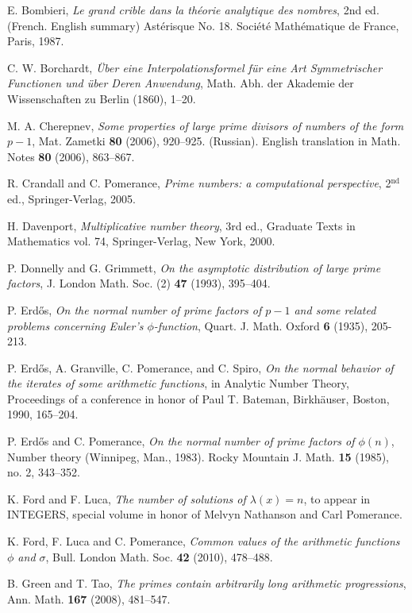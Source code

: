 \documentclass[12pt]{amsart}
\theoremstyle{remark}
\theoremstyle{plain}
\numberwithin{equation}{section}
\renewcommand{\(}{\left(}
\renewcommand{\)}{\right)}
\begin{document}
\begin{thebibliography}{BFLSP}
 E. Bombieri, {\it Le grand crible dans la th\'eorie
    analytique des nombres}, 2nd ed. (French.  English summary)
Ast\'erisque No. 18. Soci\'et\'e Math\'ematique de France, Paris, 1987.  

 C. W. Borchardt, {\it \"Uber eine Interpolationsformel 
f\"ur eine Art Symmetrischer Functionen und \"uber Deren Anwendung}, 
Math. Abh. der Akademie der Wissenschaften zu Berlin (1860), 1--20.

 M. A. Cherepnev, {\it Some properties of large 
prime divisors
of numbers of the form $p-1$}, Mat. Zametki {\bf 80} (2006), 920--925.
(Russian).  English translation in Math. Notes {\bf 80} (2006), 863--867.

 R. Crandall and C. Pomerance, {\it Prime numbers: a
  computational perspective}, 2$^{\text{nd}}$ ed., Springer-Verlag, 2005.

 H. Davenport, {\it Multiplicative number theory}, 3rd ed.,
Graduate Texts in Mathematics vol. 74, Springer-Verlag, New York, 2000.

 P. Donnelly and G. Grimmett, {\it On the asymptotic
    distribution of large prime factors}, J. London Math. Soc.
(2) {\bf 47} (1993), 395--404.

  P. Erd\H os, {\it On the normal number of prime
factors of $p-1$ and some related problems concerning Euler's
$\phi$-function},  Quart. J. Math. Oxford {\bf 6} (1935), 205-213.

 P. Erd\H os, A. Granville, C. Pomerance, and C. Spiro,
{\it On the normal behavior of the iterates of some arithmetic functions},
in Analytic Number Theory, Proceedings of a conference in honor of Paul T.
Bateman, Birkh\" auser, Boston, 1990, 165--204.

 P. Erd\H os and C. Pomerance,
{\it On the normal number of prime factors of $\phi(n)$},
 Number theory (Winnipeg, Man., 1983).  Rocky Mountain J. Math.  {\bf
   15} (1985),  no. 2, 343--352.

 K. Ford and F. Luca, {\it The number of solutions of
$\lambda(x)=n$}, to appear in INTEGERS, special volume in honor of Melvyn
Nathanson and Carl Pomerance.

 K. Ford, F. Luca and C. Pomerance, {\it Common
values of the arithmetic functions $\phi$ and $\sigma$}, Bull. London
Math. Soc. {\bf 42} (2010), 478--488.

 B. Green and T. Tao,
{\it The primes contain arbitrarily long arithmetic
  progressions}, Ann. Math. {\bf 167} (2008), 481--547.


\end{thebibliography}
\end{document}
